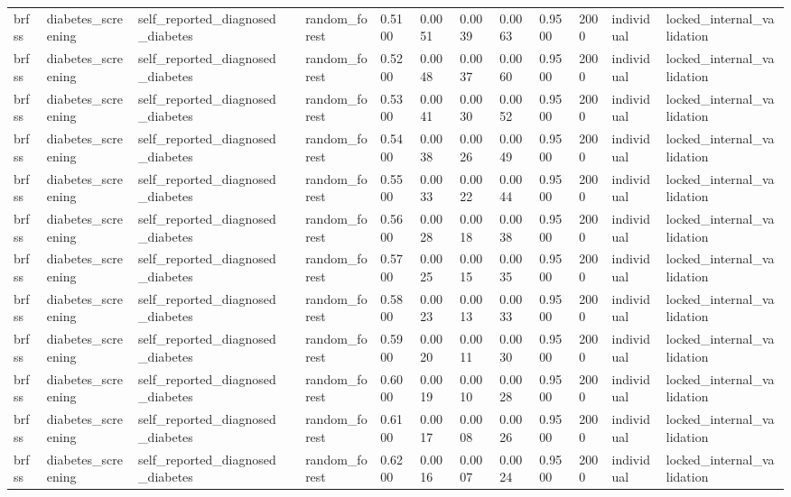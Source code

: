 \begin{tabular}{lllllllllllll}
brfss & diabetes\_screening & self\_reported\_diagnosed\_diabetes &  & random\_forest & 0.5100 & 0.0051 & 0.0039 & 0.0063 & 0.9500 & 2000 & individual & locked\_internal\_validation \\
brfss & diabetes\_screening & self\_reported\_diagnosed\_diabetes &  & random\_forest & 0.5200 & 0.0048 & 0.0037 & 0.0060 & 0.9500 & 2000 & individual & locked\_internal\_validation \\
brfss & diabetes\_screening & self\_reported\_diagnosed\_diabetes &  & random\_forest & 0.5300 & 0.0041 & 0.0030 & 0.0052 & 0.9500 & 2000 & individual & locked\_internal\_validation \\
brfss & diabetes\_screening & self\_reported\_diagnosed\_diabetes &  & random\_forest & 0.5400 & 0.0038 & 0.0026 & 0.0049 & 0.9500 & 2000 & individual & locked\_internal\_validation \\
brfss & diabetes\_screening & self\_reported\_diagnosed\_diabetes &  & random\_forest & 0.5500 & 0.0033 & 0.0022 & 0.0044 & 0.9500 & 2000 & individual & locked\_internal\_validation \\
brfss & diabetes\_screening & self\_reported\_diagnosed\_diabetes &  & random\_forest & 0.5600 & 0.0028 & 0.0018 & 0.0038 & 0.9500 & 2000 & individual & locked\_internal\_validation \\
brfss & diabetes\_screening & self\_reported\_diagnosed\_diabetes &  & random\_forest & 0.5700 & 0.0025 & 0.0015 & 0.0035 & 0.9500 & 2000 & individual & locked\_internal\_validation \\
brfss & diabetes\_screening & self\_reported\_diagnosed\_diabetes &  & random\_forest & 0.5800 & 0.0023 & 0.0013 & 0.0033 & 0.9500 & 2000 & individual & locked\_internal\_validation \\
brfss & diabetes\_screening & self\_reported\_diagnosed\_diabetes &  & random\_forest & 0.5900 & 0.0020 & 0.0011 & 0.0030 & 0.9500 & 2000 & individual & locked\_internal\_validation \\
brfss & diabetes\_screening & self\_reported\_diagnosed\_diabetes &  & random\_forest & 0.6000 & 0.0019 & 0.0010 & 0.0028 & 0.9500 & 2000 & individual & locked\_internal\_validation \\
brfss & diabetes\_screening & self\_reported\_diagnosed\_diabetes &  & random\_forest & 0.6100 & 0.0017 & 0.0008 & 0.0026 & 0.9500 & 2000 & individual & locked\_internal\_validation \\
brfss & diabetes\_screening & self\_reported\_diagnosed\_diabetes &  & random\_forest & 0.6200 & 0.0016 & 0.0007 & 0.0024 & 0.9500 & 2000 & individual & locked\_internal\_validation \\

\end{tabular}
